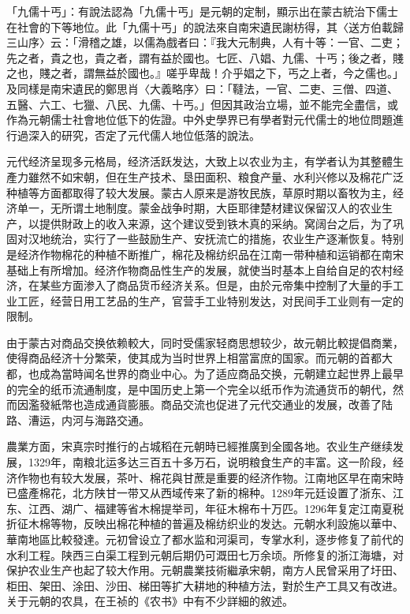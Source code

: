 「九儒十丐」：有說法認為「九儒十丐」是元朝的定制，顯示出在蒙古統治下儒士在社會的下等地位。此「九儒十丐」的說法來自南宋遺民謝枋得，其〈送方伯載歸三山序〉云：「滑稽之雄，以儒為戲者曰：『我大元制典，人有十等：一官、二吏；先之者，貴之也，貴之者，謂有益於國也。七匠、八娼、九儒、十丐；後之者，賤之也，賤之者，謂無益於國也。』嗟乎卑哉！介乎娼之下，丐之上者，今之儒也。」及同樣是南宋遺民的鄭思肖〈大義略序〉曰：「韃法，一官、二吏、三僧、四道、五醫、六工、七獵、八民、九儒、十丐。」但因其政治立場，並不能完全盡信，或作為元朝儒士社會地位低下的佐證。中外史學界已有學者對元代儒士的地位問題進行過深入的研究，否定了元代儒人地位低落的說法。

元代经济呈现多元格局，经济活跃发达，大致上以农业为主，有学者认为其整體生產力雖然不如宋朝，但在生产技术、垦田面积、粮食产量、水利兴修以及棉花广泛种植等方面都取得了较大发展。蒙古人原来是游牧民族，草原时期以畜牧为主，经济单一，无所谓土地制度。蒙金战争时期，大臣耶律楚材建议保留汉人的农业生产，以提供財政上的收入来源，这个建议受到铁木真的采纳。窝阔台之后，为了巩固对汉地统治，实行了一些鼓励生产、安抚流亡的措施，农业生产逐漸恢复。特别是经济作物棉花的种植不断推广，棉花及棉纺织品在江南一带种植和运销都在南宋基础上有所增加。经济作物商品性生产的发展，就使当时基本上自给自足的农村经济，在某些方面渗入了商品货币经济关系。但是，由於元帝集中控制了大量的手工业工匠，经营日用工艺品的生产，官营手工业特别发达，对民间手工业则有一定的限制。

由于蒙古对商品交换依赖較大，同时受儒家轻商思想较少，故元朝比較提倡商業，使得商品经济十分繁荣，使其成为当时世界上相當富庶的国家。而元朝的首都大都，也成為當時闻名世界的商业中心。为了适应商品交换，元朝建立起世界上最早的完全的纸币流通制度，是中国历史上第一个完全以纸币作为流通货币的朝代，然而因濫發紙幣也造成通貨膨脹。商品交流也促进了元代交通业的发展，改善了陆路、漕运，内河与海路交通。

農業方面，宋真宗时推行的占城稻在元朝時已經推廣到全國各地。农业生产继续发展，1329年，南粮北运多达三百五十多万石，说明粮食生产的丰富。这一阶段，经济作物也有较大发展，茶叶、棉花與甘蔗是重要的经济作物。江南地区早在南宋時已盛產棉花，北方陕甘一带又从西域传来了新的棉种。1289年元廷设置了浙东、江东、江西、湖广、福建等省木棉提举司，年征木棉布十万匹。1296年复定江南夏税折征木棉等物，反映出棉花种植的普遍及棉纺织业的发达。元朝水利設施以華中、華南地區比較發達。元初曾设立了都水监和河渠司，专掌水利，逐步修复了前代的水利工程。陕西三白渠工程到元朝后期仍可溉田七万余顷。所修复的浙江海塘，对保护农业生产也起了较大作用。元朝農業技術繼承宋朝，南方人民曾采用了圩田、柜田、架田、涂田、沙田、梯田等扩大耕地的种植方法，對於生产工具又有改进。关于元朝的农具，在王祯的《农书》中有不少詳細的敘述。


